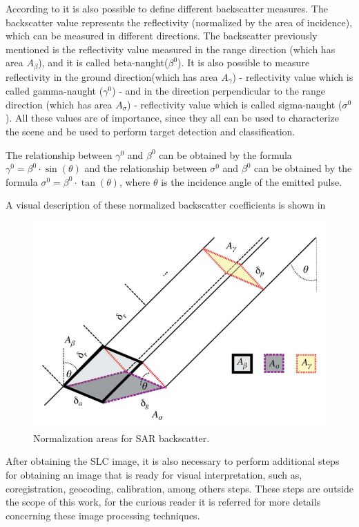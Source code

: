 According to \cite{Raney,Small} it is also possible to define different backscatter measures. The backscatter value represents the reflectivity (normalized by the area of incidence), which can be measured in different directions. The backscatter previously mentioned is the reflectivity value measured in the range direction (which has area $A_\beta$), and it is called beta-naught($\beta^0$). It is also possible to measure reflectivity in the ground direction(which has area $A_\gamma$) - reflectivity value which is called gamma-naught ($\gamma^0$) - and in the direction perpendicular to the range direction (which has area $A_\sigma$) - reflectivity value which is called sigma-naught ($\sigma^0$). All these values are of importance, since they all can be used to characterize the scene and be used to perform target detection and classification. 

The relationship between $\gamma^0$ and $\beta^0$ can be obtained by the formula $\gamma^0 = \beta^0 \cdot \sin(\theta)$ and the relationship between $\sigma^0$ and $\beta^0$ can be obtained by the formula $\sigma^0 = \beta^0 \cdot \tan(\theta)$, where $\theta$ is the incidence angle of the emitted pulse.

A visual description of these normalized backscatter coefficients is shown in 

\begin{figure}[H]
    \centering
    \includegraphics[width=0.8\linewidth]{Cap1-Bib-Review/retang.png}
    \caption{Normalization areas for SAR backscatter. \cite{Small}}
    \label{fig:normalization_areas}
\end{figure}

After obtaining the SLC image, it is also necessary to perform additional steps for obtaining an image that is ready for visual interpretation, such as, coregistration, geocoding, calibration, among others steps. These steps are outside the scope of this work, for the curious reader it is referred \cite{Alberto} for more details concerning these image processing techniques.

